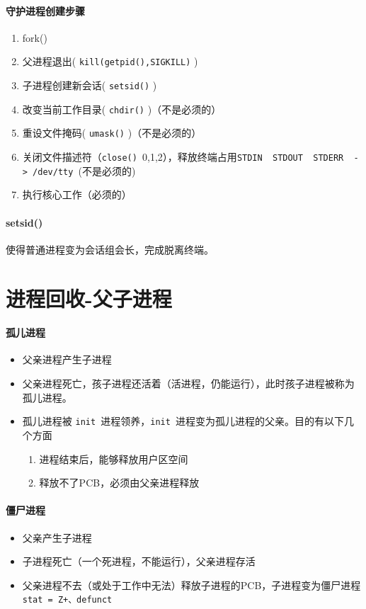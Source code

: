 \documentclass[UTF8,a4paper,12pt]{ctexbook}
\begin{document}
		\paragraph{守护进程创建步骤}
			\begin{enumerate}[itemindent = 1em]
				\item fork()
				\item 父进程退出( \verb|kill(getpid(),SIGKILL)| )
				\item 子进程创建新会话( \verb|setsid()| )
				\item 改变当前工作目录( \verb|chdir()| )（不是必须的）
				\item 重设文件掩码( \verb|umask()| )（不是必须的）
				\item 关闭文件描述符（\verb|close() |0,1,2），释放终端占用\verb|STDIN  STDOUT  STDERR  -> /dev/tty |(不是必须的)
				\item 执行核心工作（必须的）
			\end{enumerate}	
		
		\paragraph{setsid()}使得普通进程变为会话组会长，完成脱离终端。
		
	\section{进程回收-父子进程}
		\paragraph{孤儿进程}
			\begin{itemize}
				\item 父亲进程产生子进程
				\item 父亲进程死亡，孩子进程还活着（活进程，仍能运行），此时孩子进程被称为 孤儿进程。
				\item 孤儿进程被 \verb|init |进程领养，\verb|init |进程变为孤儿进程的父亲。目的有以下几个方面
					\begin{enumerate}[itemindent = 1em]
						\item 进程结束后，能够释放用户区空间
						\item 释放不了PCB，必须由父亲进程释放
					\end{enumerate}
			\end{itemize}
			
		\paragraph{僵尸进程}
			\begin{itemize}
				\item 父亲产生子进程
				\item 子进程死亡（一个死进程，不能运行），父亲进程存活
				\item 父亲进程不去（或处于工作中无法）释放子进程的PCB，子进程变为僵尸进程\verb|stat = Z+、defunct|
			\end{itemize}
			
\end{document}
